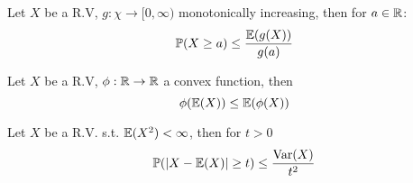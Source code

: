 \begin{theorem*}
  Let \(X\) be a R.V, \(g: \chi \to [0, \infty)\) monotonically increasing, then for \(a \in \mathbb{R}\):
  \vspace{-7pt}
  \[\mathbb{P}(X \geq a) \leq \frac{\mathbb{E}(g(X))}{g(a)}\]
\end{theorem*}

\begin{theorem*}
  Let \(X\) be a R.V, \(\phi: \mathbb{R} \to \mathbb{R}\) a convex function, then
  \vspace{-7pt}
  \[\phi(\mathbb{E}(X)) \leq \mathbb{E}(\phi(X))\]
\end{theorem*}

\begin{theorem*}
  Let \(X\) be a R.V. s.t. \(\mathbb{E}(X^2) < \infty\), then for \(t > 0\)
  \[\mathbb{P}(|X - \mathbb{E}(X)| \geq t) \leq \frac{\operatorname{Var}(X)}{t^2}\]
\end{theorem*}
